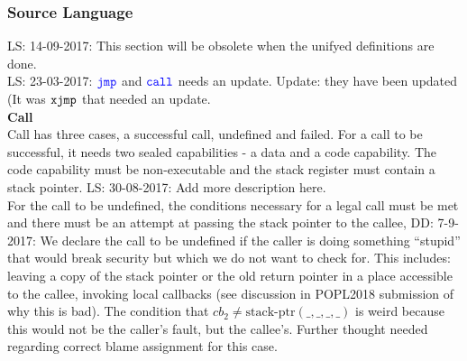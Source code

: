 \documentclass[a4paper]{article}
\newcommand\lau[1]{{\color{purple} \sf \footnotesize {LS: #1}}\\}
\newcommand\dominique[1]{{\color{purple} \sf \footnotesize {DD: #1}}\\}
\newcommand{\sourcecolor}[1]{\color{blue}}
\newcommand{\src}[1]{{\sourcecolor{} #1}}
\newcommand{\targetcolor}[1]{\color{black}}
\newcommand{\trg}[1]{{\targetcolor{} #1}}
\newcommand{\zinstr}[1]{\texttt{#1}}
\newcommand{\oneinstr}[2]{
  \ifthenelse{\equal{#2}{}}
  {\zinstr{#1}}
  {\zinstr{#1} \; #2}
}
\newcommand{\twoinstr}[3]{
  \ifthenelse{\equal{#2#3}{}}
  {\zinstr{#1}}
  {\zinstr{#1} \; #2 \; #3}
}
\newcommand{\sjmp}[1]{\oneinstr{\src{jmp}}{#1}}
\newcommand{\scall}[2]{\twoinstr{\src{call}}{#1}{#2}}
\newcommand{\sxjmp}[2]{\twoinstr{\trg{xjmp}}{#1}{#2}}
\newcommand{\stkptr}[1]{\mathrm{stack\text{-}ptr}(#1)}
\newcommand{\var}[1]{\mathit{#1}}
\newcommand{\cb}{\var{cb}}
\begin{document}
\subsubsection{Source Language}
\label{sec:source-language}
\lau{14-09-2017: This section will be obsolete when the unifyed definitions are done.}
\lau{23-03-2017: $\sjmp{}$ and $\scall{}{}$ needs an update. Update: they have been updated (It was $\sxjmp{}{}$ that needed an update.}

\textbf{Call}\\
Call has three cases, a successful call, undefined and failed. For a call to be successful, it needs two sealed capabilities - a data and a code capability. The code capability must be non-executable and the stack register must contain a stack pointer.
\lau{30-08-2017: Add more description here.}

For the call to be undefined, the conditions necessary for a legal call must be met and there must be an attempt at passing the stack pointer to the callee,
\dominique{7-9-2017: We declare the call to be undefined if the caller is doing something ``stupid'' that would break security but which we do not want to check for.  This includes: leaving a copy of the stack pointer or the old return pointer in a place accessible to the callee, invoking local callbacks (see discussion in POPL2018 submission of why this is bad).  The condition that $\cb_2 \neq \stkptr{\_,\_,\_,\_}$ is weird because this would not be the caller's fault, but the callee's.  Further thought needed regarding correct blame assignment for this case.}
\end{document}
